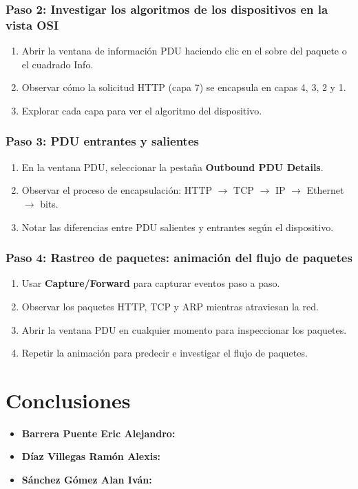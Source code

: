 \documentclass[a4paper,11pt]{article}
\begin{document}
\subsubsection{Paso 2: Investigar los algoritmos de los dispositivos en la vista OSI}
\begin{enumerate}[label=\alph*.]
    \item Abrir la ventana de información PDU haciendo clic en el sobre del paquete o el cuadrado Info.
    \item Observar cómo la solicitud HTTP (capa 7) se encapsula en capas 4, 3, 2 y 1.
    \item Explorar cada capa para ver el algoritmo del dispositivo.
\end{enumerate}

\subsubsection{Paso 3: PDU entrantes y salientes}
\begin{enumerate}[label=\alph*.]
    \item En la ventana PDU, seleccionar la pestaña \textbf{Outbound PDU Details}.
    \item Observar el proceso de encapsulación: HTTP $\rightarrow$ TCP $\rightarrow$ IP $\rightarrow$ Ethernet $\rightarrow$ bits.
    \item Notar las diferencias entre PDU salientes y entrantes según el dispositivo.
\end{enumerate}

\subsubsection{Paso 4: Rastreo de paquetes: animación del flujo de paquetes}
\begin{enumerate}[label=\alph*.]
    \item Usar \textbf{Capture/Forward} para capturar eventos paso a paso.
    \item Observar los paquetes HTTP, TCP y ARP mientras atraviesan la red.
    \item Abrir la ventana PDU en cualquier momento para inspeccionar los paquetes.
    \item Repetir la animación para predecir e investigar el flujo de paquetes.
\end{enumerate}

\section{Conclusiones}
\begin{itemize}
    \item \textbf{Barrera Puente Eric Alejandro:}
    

    \item \textbf{Díaz Villegas Ramón Alexis:}


    \item \textbf{Sánchez Gómez Alan Iván:}
\end{itemize}
\end{document}
